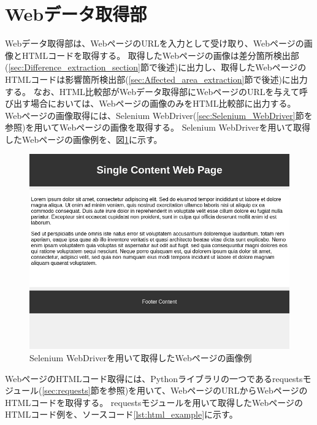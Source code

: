\section{Webデータ取得部}\label{sec:Web_data_get_section}
Webデータ取得部は、WebページのURLを入力として受け取り、Webページの画像とHTMLコードを取得する。
取得したWebページの画像は差分箇所検出部(\ref{sec:Difference_extraction_section}節で後述)に出力し、取得したWebページのHTMLコードは影響箇所検出部(\ref{sec:Affected_area_extraction}節で後述)に出力する。
なお、HTML比較部がWebデータ取得部にWebページのURLを与えて呼び出す場合においては、Webページの画像のみをHTML比較部に出力する。
Webページの画像取得には、Selenium WebDriver(\ref{sec:Selenium_WebDriver}節を参照)を用いてWebページの画像を取得する。
Selenium WebDriverを用いて取得したWebページの画像例を、図\ref{fig:4_get_images}に示す。
\begin{figure}[tp]
    \begin{center}
        \includegraphics[width=1.0\columnwidth]{image/4_get_images.png}
        \caption{Selenium WebDriverを用いて取得したWebページの画像例}
        \label{fig:4_get_images}
    \end{center}
\end{figure}
WebページのHTMLコード取得には、Pythonライブラリの一つであるrequestsモジュール(\ref{sec:requests}節を参照)を用いて、WebページのURLからWebページのHTMLコードを取得する。
requestsモジュールを用いて取得したWebページのHTMLコード例を、ソースコード\ref{lst:html_example}に示す。
